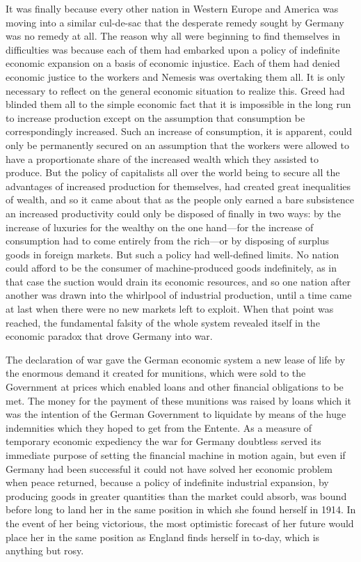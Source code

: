 \documentclass{book}
\begin{document}
It was finally because every other nation in Western Europe and America was moving into a similar cul-de-sac that the desperate remedy sought by Germany was no remedy at all. The reason why all were beginning to find themselves in difficulties was because each of them had embarked upon a policy of indefinite economic expansion on a basis of economic injustice. Each of them had denied economic justice to the workers and Nemesis was overtaking them all. It is only necessary to reflect on the general economic situation to realize this. Greed had blinded them all to the simple economic fact that it is impossible in the long run to increase production except on the assumption that consumption be correspondingly increased. Such an increase of consumption, it is apparent, could only be permanently secured on an assumption that the workers were allowed to have a proportionate share of the increased wealth which they assisted to produce. But the policy of capitalists all over the world being to secure all the advantages of increased production for themselves, had created great inequalities of wealth, and so it came about that as the people only earned a bare subsistence an increased productivity could only be disposed of finally in two ways: by the increase of luxuries for the wealthy on the one hand—for the increase of consumption had to come entirely from the rich—or by disposing of surplus goods in foreign markets. But such a policy had well-defined limits. No nation could afford to be the consumer of machine-produced goods indefinitely, as in that case the suction would drain its economic resources, and so one nation after another was drawn into the whirlpool of industrial production, until a time came at last when there were no new markets left to exploit. When that point was reached, the fundamental falsity of the whole system revealed itself in the economic paradox that drove Germany into war.

The declaration of war gave the German economic system a new lease of life by the enormous demand it created for munitions, which were sold to the Government at prices which enabled loans and other financial obligations to be met. The money for the payment of these munitions was raised by loans which it was the intention of the German Government to liquidate by means of the huge indemnities which they hoped to get from the Entente. As a measure of temporary economic expediency the war for Germany doubtless served its immediate purpose of setting the financial machine in motion again, but even if Germany had been successful it could not have solved her economic problem when peace returned, because a policy of indefinite industrial expansion, by producing goods in greater quantities than the market could absorb, was bound before long to land her in the same position in which she found herself in 1914. In the event of her being victorious, the most optimistic forecast of her future would place her in the same position as England finds herself in to-day, which is anything but rosy.
\end{document}
